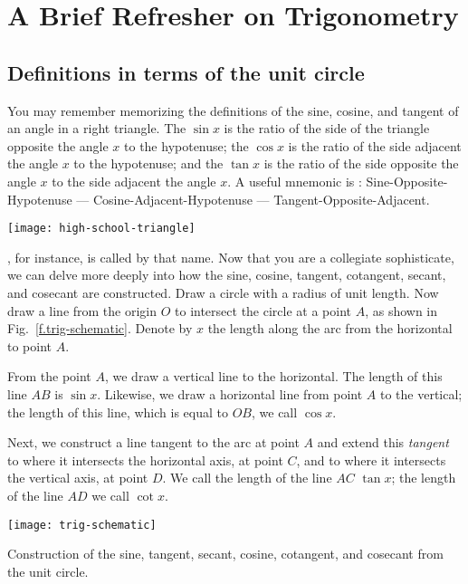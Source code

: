 \section{A Brief Refresher on Trigonometry}

\subsection{Definitions in terms of the unit circle}

You may remember memorizing the definitions of the sine, cosine, and tangent of an angle in a right triangle. The $\sin x$ is the ratio of the side of the triangle opposite the angle $x$ to the hypotenuse; the $\cos x$ is the ratio of the side adjacent the angle $x$ to the hypotenuse; and the $\tan x$ is the ratio of the side opposite the angle $x$ to the side adjacent the angle $x$. A useful mnemonic is : Sine-Opposite-Hypotenuse --- Cosine-Adjacent-Hypotenuse --- Tangent-Opposite-Adjacent.

\begin{marginfigure}
\texttt{[image: high-school-triangle]}
\label{f.high-school-triangle}
\end{marginfigure}

, for instance, is called by that name.  Now that you are a  collegiate sophisticate, we can delve more deeply into how the sine, cosine, tangent, cotangent, secant, and cosecant are constructed.
Draw a circle with a radius of unit length.  Now draw a line from the origin $O$ to intersect the circle at a point $A$, as shown in Fig.~\ref{f.trig-schematic}.  Denote by $x$ the length along the arc from the horizontal to point $A$.

From the point $A$, we draw a vertical line to the horizontal.  The length of this line $AB$ is $\sin x$. Likewise, we draw a horizontal line from point $A$ to the vertical; the length of this line, which is equal to $OB$, we call $\cos x$.  

Next, we construct a line tangent to the arc at point $A$ and extend this \emph{tangent} to where it intersects the horizontal axis, at point $C$, and to where it intersects the vertical axis, at point $D$.  We call the length of the line $AC$ $\tan x$; the length of the line $AD$ we call $\cot x$.

\begin{marginfigure}[-6\baselineskip]
\texttt{[image: trig-schematic]}
\caption[Construction from the unit circle]{Construction of the sine, tangent, secant, cosine, cotangent, and cosecant from the unit circle.}
\label{f.trig-schematic}
\end{marginfigure}

